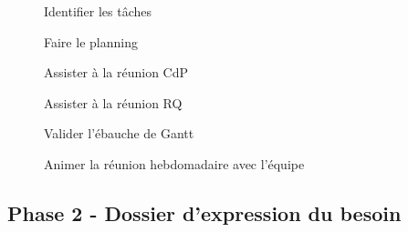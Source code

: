 \begin{description}
        \begin{description}
            \item[\textbullet] Identifier les tâches
            \item[\textbullet] Faire le planning
            \item[\textbullet] Assister à la réunion CdP
            \item[\textbullet] Assister à la réunion RQ
            \item[\textbullet] Valider l'ébauche de Gantt
            \item[\textbullet] Animer la réunion hebdomadaire avec l’équipe
        \end{description}
\end{description}

\subsection{Phase 2 - Dossier d’expression du besoin}

